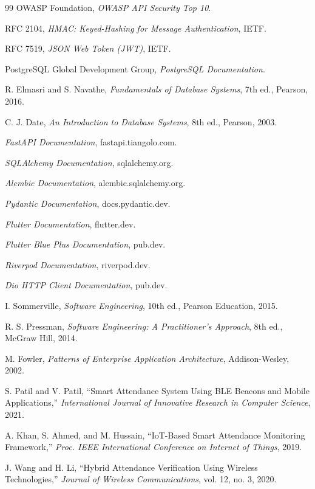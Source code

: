\documentclass[12pt, a4paper, oneside]{report}
\begin{document}
\begin{thebibliography}{99}
 OWASP Foundation, \textit{OWASP API Security Top 10}.

 RFC 2104, \textit{HMAC: Keyed-Hashing for Message Authentication}, IETF.

 RFC 7519, \textit{JSON Web Token (JWT)}, IETF.

 PostgreSQL Global Development Group, \textit{PostgreSQL Documentation}.

 R. Elmasri and S. Navathe, \textit{Fundamentals of Database Systems}, 7th ed., Pearson, 2016.

 C. J. Date, \textit{An Introduction to Database Systems}, 8th ed., Pearson, 2003.

 \textit{FastAPI Documentation}, fastapi.tiangolo.com.

 \textit{SQLAlchemy Documentation}, sqlalchemy.org.

 \textit{Alembic Documentation}, alembic.sqlalchemy.org.

 \textit{Pydantic Documentation}, docs.pydantic.dev.

 \textit{Flutter Documentation}, flutter.dev.

 \textit{Flutter Blue Plus Documentation}, pub.dev.

 \textit{Riverpod Documentation}, riverpod.dev.

 \textit{Dio HTTP Client Documentation}, pub.dev.

 I. Sommerville, \textit{Software Engineering}, 10th ed., Pearson Education, 2015.

 R. S. Pressman, \textit{Software Engineering: A Practitioner's Approach}, 8th ed., McGraw Hill, 2014.

 M. Fowler, \textit{Patterns of Enterprise Application Architecture}, Addison-Wesley, 2002.

 S. Patil and V. Patil, ``Smart Attendance System Using BLE Beacons and Mobile Applications,'' \textit{International Journal of Innovative Research in Computer Science}, 2021.

 A. Khan, S. Ahmed, and M. Hussain, ``IoT-Based Smart Attendance Monitoring Framework,'' \textit{Proc. IEEE International Conference on Internet of Things}, 2019.

 J. Wang and H. Li, ``Hybrid Attendance Verification Using Wireless Technologies,'' \textit{Journal of Wireless Communications}, vol. 12, no. 3, 2020.


\end{thebibliography}
\end{document}
